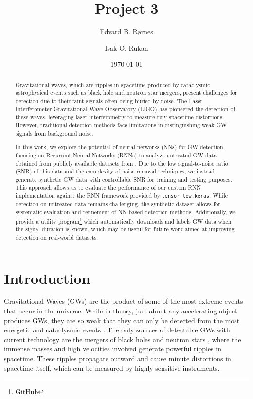 \documentclass[%
reprint,
amsmath,amssymb,
aps,
]{revtex4-2}
\begin{document}
	
\title{Project 3}
\author{Edvard B. Rørnes}
\author{Isak O. Rukan}
\date{\today}

\begin{abstract}
	Gravitational waves, which are ripples in spacetime produced by cataclysmic astrophysical events such as black hole and neutron star mergers, present challenges for detection due to their faint signals often being buried by noise. The Laser Interferometer Gravitational-Wave Observatory (LIGO) has pioneered the detection of these waves, leveraging laser interferometry to measure tiny spacetime distortions. However, traditional detection methods face limitations in distinguishing weak GW signals from background noise.
	
	In this work, we explore the potential of neural networks (NNs) for GW detection, focusing on Recurrent Neural Networks (RNNs) to analyze untreated GW data obtained from publicly available datasets from \cite{gwosc}. Due to the low signal-to-noise ratio (SNR) of this data and the complexity of noise removal techniques, we instead generate synthetic GW data with controllable SNR for training and testing purposes. This approach allows us to evaluate the performance of our custom RNN implementation against the RNN framework provided by \texttt{tensorflow.keras}. While detection on untreated data remains challenging, the synthetic dataset allows for systematic evaluation and refinement of NN-based detection methods. Additionally, we provide a utility program\footnote{\href{https://github.com/EdvardRornes/FYS-STK4155/tree/main/Project3}{GitHub}} which automatically downloads and labels GW data when the signal duration is known, which may be useful for future work aimed at improving detection on real-world datasets.
\end{abstract}

\maketitle

\section{Introduction}
Gravitational Waves (GWs) are the product of some of the most extreme events that occur in the universe. While in theory, just about any accelerating object produces GWs, they are so weak that they can only be detected from the most energetic and cataclysmic events \cite{ligo_gw_sources}. The only sources of detectable GWs with current technology are the mergers of black holes and neutron stars \cite{LIGOScientific:2007fwp}, where the immense masses and high velocities involved generate powerful ripples in spacetime. These ripples propagate outward and cause minute distortions in spacetime itself, which can be measured by highly sensitive instruments.
\end{document}
